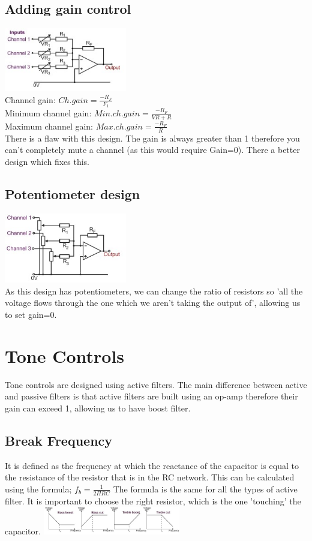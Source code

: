 \documentclass[a4paper, 11pt, twocolumn]{article}
\begin{document}
    \subsection{Adding gain control}
    \includegraphics[width=0.4\textwidth]{summingAmpAddGain.jpg}\\
    Channel gain: $\displaystyle Ch. gain = \frac{-R_F}{F_1}$\\
    Minimum channel gain: $\displaystyle Min. ch. gain = \frac{-R_F}{VR+R}$\\
    Maximum channel gain: $\displaystyle Max. ch. gain = \frac{-R_F}{R}$\\
    There is a flaw with this design. The gain is always greater than 1 therefore you can't completely mute a channel (as this would require Gain=0). There a better design which fixes this.

    \subsection{Potentiometer design}
    \includegraphics[width=0.4\textwidth]{potentAmp.jpg} \\
    As this design has potentiometers, we can change the ratio of resistors so 'all the voltage flows through the one which we aren't taking the output of', allowing us to set gain=0.

    \section{Tone Controls}
    Tone controls are designed using active filters. The main difference between active and passive filters is that active filters are built using an op-amp therefore their gain can exceed 1, allowing us to have boost filter.
    \subsection{Break Frequency}
    It is defined as the frequency at which the reactance of the capacitor is equal to the resistance of the resistor that is in the RC network.
    This can be calculated using the formula; $\displaystyle f_b = \frac{1}{2\Pi RC}$
    The formula is the same for all the types of active filter. It is important to choose the right resistor, which is the one 'touching' the capacitor.
    \includegraphics[width=0.45\textwidth]{activeFilterGraphs.jpg}
\end{document}

